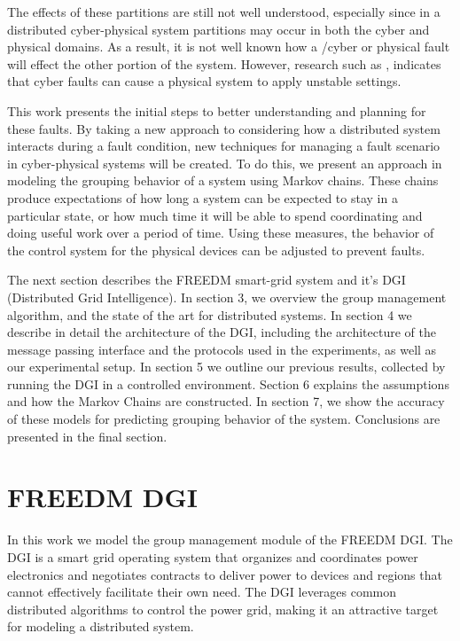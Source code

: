 The effects of these partitions are still not well understood, especially since in a distributed
cyber-physical system partitions may occur in both the cyber and physical domains. As a result,
it is not well known how a /cyber or physical fault will effect the other portion of the system.
However, research such as \cite{HARINI}\cite{TSG}, indicates that cyber faults can cause a
physical system to apply unstable settings.

This work presents the initial steps to better understanding and planning for these faults.
By taking a new approach to considering how a distributed system interacts during a fault condition,
new techniques for managing a fault scenario in cyber-physical systems will be created. To do
this, we present an approach in modeling the grouping behavior of a system using Markov chains.
These chains produce expectations of how long a system can be expected to stay in a particular
state, or how much time it will be able to spend coordinating and doing useful work over a period
of time. Using these measures, the behavior of the control system for the physical devices 
can be adjusted to prevent faults.

The next section describes the FREEDM smart-grid system and it's DGI (Distributed Grid Intelligence). In section 3,
we overview the group management algorithm, and the state of the art for distributed
systems. In section 4 we describe in detail the architecture of the DGI, including the architecture
of the message passing interface and the protocols used in the experiments, as well as our
experimental setup. In section 5 we outline our previous results, collected by running the DGI
in a controlled environment. Section 6 explains the assumptions and how the Markov Chains are
constructed. In section 7, we show the accuracy of these models for predicting grouping behavior
of the system. Conclusions are presented in the final section.

\section{FREEDM DGI}
In this work we model the group management module of the FREEDM DGI.
The DGI is a smart grid operating system
that organizes and coordinates power electronics and negotiates contracts to
deliver power to devices and regions that cannot effectively facilitate their own need.
The DGI leverages common distributed algorithms to control the power grid, making it an
attractive target for modeling a distributed system.


